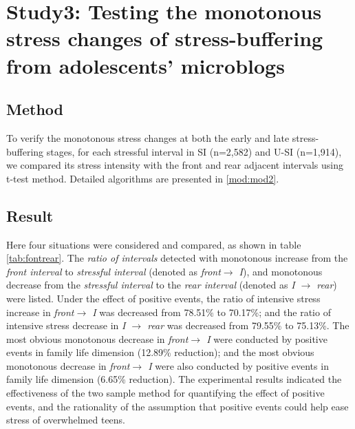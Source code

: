 \section{Study3: Testing the monotonous stress changes of stress-buffering from adolescents' microblogs}
\subsection{Method}
To verify the monotonous stress changes at both the early and late stress-buffering stages,
for each stressful interval in SI (n=2,582) and U-SI (n=1,914),
we compared its stress intensity with the front and rear adjacent intervals using t-test method.
Detailed algorithms are presented in \ref{mod:mod2}.

\subsection{Result}
Here four situations were considered and compared,
as shown in table \ref{tab:fontrear}.
The \emph{ratio of intervals} detected with monotonous increase from the \emph{front interval} to \emph{stressful interval} (denoted as \emph{front$ \rightarrow$ I}),
and monotonous decrease from the \emph{stressful interval} to the \emph{rear interval} (denoted as \emph{I $\rightarrow$ rear}) were listed.
Under the effect of positive events,
the ratio of intensive stress increase in \emph{front$ \rightarrow$ I} was decreased from 78.51\% to 70.17\%;
and the ratio of intensive stress decrease in \emph{I $\rightarrow$ rear} was decreased from 79.55\% to 75.13\%.
The most obvious monotonous decrease in \emph{front$ \rightarrow$ I} were conducted by positive events in family life dimension (12.89\% reduction);
and the most obvious monotonous decrease in \emph{front$ \rightarrow$ I} were also conducted by positive events in family life dimension (6.65\% reduction).
The experimental results indicated the effectiveness of the two sample method for quantifying the effect of positive events,
and the rationality of the assumption that positive events could help ease stress of overwhelmed teens.
